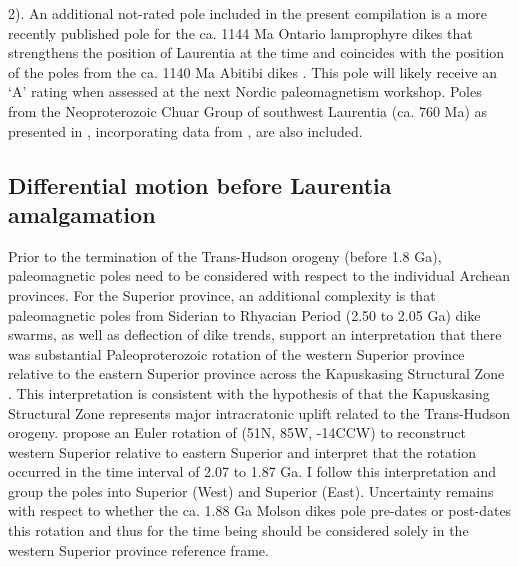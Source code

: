 \documentclass[twocolumn, switch]{article} %
\begin{document}
2). An additional not-rated pole included in the present compilation is a more recently published pole for the ca. 1144 Ma Ontario lamprophyre dikes \citep{Piispa2018a} that strengthens the position of Laurentia at the time and coincides with the position of the poles from the ca. 1140 Ma Abitibi dikes \citep{Ernst1993a}. This pole will likely receive an `A' rating when assessed at the next Nordic paleomagnetism workshop. Poles from the Neoproterozoic Chuar Group of southwest Laurentia (ca. 760 Ma)  as presented in \cite{Eyster2019a}, incorporating data from \cite{Weil2004a}, are also included. 

\subsection{Differential motion before Laurentia amalgamation}

Prior to the termination of the Trans-Hudson orogeny (before 1.8 Ga), paleomagnetic poles need to be considered with respect to the individual Archean provinces. For the Superior province, an additional complexity is that paleomagnetic poles from Siderian to Rhyacian Period (2.50 to 2.05 Ga) dike swarms, as well as deflection of dike trends, support an interpretation that there was substantial Paleoproterozoic rotation of the western Superior province relative to the eastern Superior province across the Kapuskasing Structural Zone \citep{Bates1991a, Evans2010a}. This interpretation is consistent with the hypothesis of \citet{Hoffman1988a} that the Kapuskasing Structural Zone represents major intracratonic uplift related to the Trans-Hudson orogeny. \cite{Evans2010a} propose an Euler rotation of (51\textdegree N, 85\textdegree W, -14\textdegree CCW) to reconstruct western Superior relative to eastern Superior and interpret that the rotation occurred in the time interval of 2.07 to 1.87 Ga.  I follow this interpretation and group the poles into Superior (West) and Superior (East).  Uncertainty remains with respect to whether the ca. 1.88 Ga Molson dikes pole pre-dates or post-dates this rotation \citep{Evans2010a} and thus for the time being should be considered solely in the western Superior province reference frame.
\end{document}

